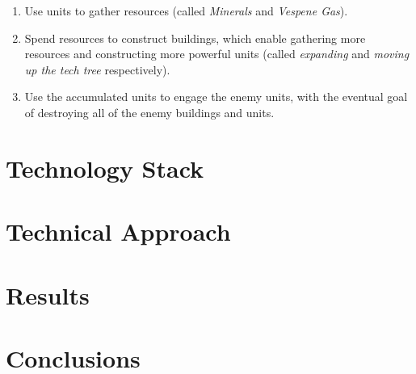 \documentclass[twocolumn]{article}
\begin{document}
\begin{enumerate}
  \item Use units to gather resources (called \textit{Minerals} and \textit{Vespene Gas}).
  \item Spend resources to construct buildings, which enable gathering more resources and constructing more powerful units (called \textit{expanding} and \textit{moving up the tech tree} respectively). 
  \item Use the accumulated units to engage the enemy units, with the eventual goal of destroying all of the enemy buildings and units. 
\end{enumerate}


\section{Technology Stack}
\lipsum[3]
\section{Technical Approach}
\lipsum[3]
\section{Results}
\lipsum[3]
\section{Conclusions}
\lipsum[3]
\end{document}
